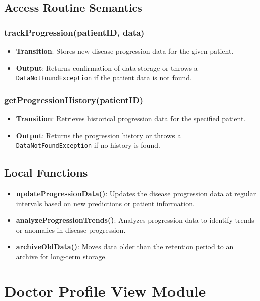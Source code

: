 \documentclass[12pt, titlepage]{article}
\begin{document}
\subsection{Access Routine Semantics}
\subsubsection{trackProgression(patientID, data)}

\begin{itemize}
    \item \textbf{Transition}: Stores new disease progression data for the given patient.
    \item \textbf{Output}: Returns confirmation of data storage or throws a \texttt{DataNotFoundException} if the patient data is not found.
\end{itemize}

\subsubsection{getProgressionHistory(patientID)}

\begin{itemize}
    \item \textbf{Transition}: Retrieves historical progression data for the specified patient.
    \item \textbf{Output}: Returns the progression history or throws a \texttt{DataNotFoundException} if no history is found.
\end{itemize}


\subsection{Local Functions}
\begin{itemize}
\item \textbf{updateProgressionData()}: Updates the disease progression data at regular intervals based on new predictions or patient information.
\item \textbf{analyzeProgressionTrends()}: Analyzes progression data to identify trends or anomalies in disease progression.
\item \textbf{archiveOldData()}: Moves data older than the retention period to an archive for long-term storage.
\end{itemize}
\section{Doctor Profile View Module}
\end{document}
